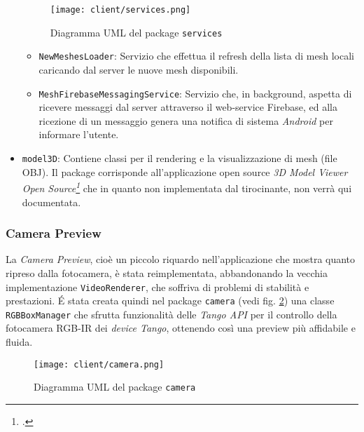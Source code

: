 \begin{itemize}
\begin{figure}[!h] 
    \centering 
    \texttt{[image: client/services.png]} 
    \caption{Diagramma UML del package \texttt{services}}
   \label{fig:services}
\end{figure}
	\begin{itemize}
	\item\texttt{NewMeshesLoader}: Servizio che effettua il refresh della lista di mesh locali caricando dal server le nuove mesh disponibili.
	\item\texttt{MeshFirebaseMessagingService}: Servizio che, in background, aspetta di ricevere messaggi dal server attraverso il web-service Firebase, ed alla ricezione di un messaggio genera una notifica di sistema \emph{Android} per informare l'utente.
	\end{itemize}
\item\texttt{model3D}: Contiene classi per il rendering e la visualizzazione di mesh (file OBJ). Il package corrisponde all'applicazione open source \emph{3D Model Viewer Open Source\footcite{https://play.google.com/store/apps/details?id=org.andresoviedo.dddmodel&hl=it}} che in quanto non implementata dal tirocinante, non verrà qui documentata.
\end{itemize}

\subsubsection{Camera Preview}
La \emph{Camera Preview}, cioè un piccolo riquardo nell'applicazione che mostra quanto ripreso dalla fotocamera, è stata reimplementata, abbandonando la vecchia implementazione \texttt{VideoRenderer}, che soffriva di problemi di stabilità e prestazioni. \'E stata creata quindi nel package \texttt{camera} (vedi fig. \ref{fig:camera}) una classe \texttt{RGBBoxManager} che sfrutta funzionalità delle \emph{Tango API} per il controllo della fotocamera RGB-IR dei \emph{device Tango}, ottenendo così una preview più affidabile e fluida.
\begin{figure}[!h] 
    \centering 
    \texttt{[image: client/camera.png]} 
    \caption{Diagramma UML del package \texttt{camera}}
   \label{fig:camera}
\end{figure}

